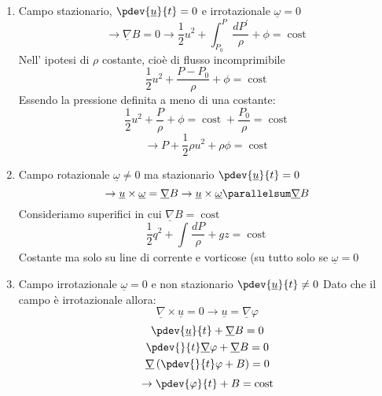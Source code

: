 \begin{enumerate}
\item Campo stazionario, $ \pdev{\underline{u}}{t}=0 $ e irrotazionale $ \underline{\omega}=0 $ 
  \[
    \rightarrow \underline{\nabla}B=0 \to \frac{1}{2}u^2+\displaystyle{\int_{P_0}^{P}} \frac{{dP^\prime}}{\rho }+\phi = \operatorname{cost}
  \]
  Nell' ipotesi di $ \rho  $ costante, cioè di flusso incomprimibile 
  \[
    \frac{1}{2}u^2+\frac{{P-P_0}}{\rho }+\phi =\operatorname{cost} 
  \]
  Essendo la pressione definita a meno di una costante:
  \[
    \frac{1}{2}u^2 + \frac{P}{\rho }+\phi =\operatorname{cost} +\frac{P_0}{\rho }=\operatorname{cost}
  \]
  \begin{equation}
    \rightarrow P + \frac{1}{2}\rho u^2+\rho \phi =\operatorname{cost}
  \end{equation}
\item Campo rotazionale $ \underline{\omega} \neq 0$ ma stazionario $  \pdev{\underline{u}}{t} = 0 $
  \[
\rightarrow \underline{u}\times \underline{\omega} = \underline{\nabla}B \to \underline{u}\times \underline{\omega} \parallelsum \underline{\nabla}B 
\]
Consideriamo superifici in cui $ \underline{\nabla}B = \operatorname{cost}  $ 
\begin{equation}
  \frac{1}{2}q^2+\displaystyle{\int_{}^{}}\frac{dP}{\rho }+gz = \operatorname{cost} 
\end{equation}
Costante ma solo su line di corrente e vorticose (su tutto solo se $ \underline{\omega}=0 $ 
\item Campo irrotazionale $ \underline{\omega} = 0 $ e non stazionario $ \pdev{\underline{u}}{t} \neq 0 $
  Dato che il campo è irrotazionale allora:
  \[
    \underline{\nabla}\times  \underline{u} = 0 \rightarrow \underline{u}=\underline{\nabla}\varphi 
  \] 
  \begin{gather*}
    \pdev{\underline{u}}{t}+\underline{\nabla}B = 0 \\
    \pdev{}{t}\underline{\nabla} \varphi +\underline{\nabla} B =0 \\
    \underline{\nabla} \left( \pdev{}{t}\varphi +B \right) =0
  \end{gather*}
  \begin{equation}
    \rightarrow \pdev{\varphi }{t}+B = \operatorname{cost} 
  \end{equation}
\end{enumerate}


